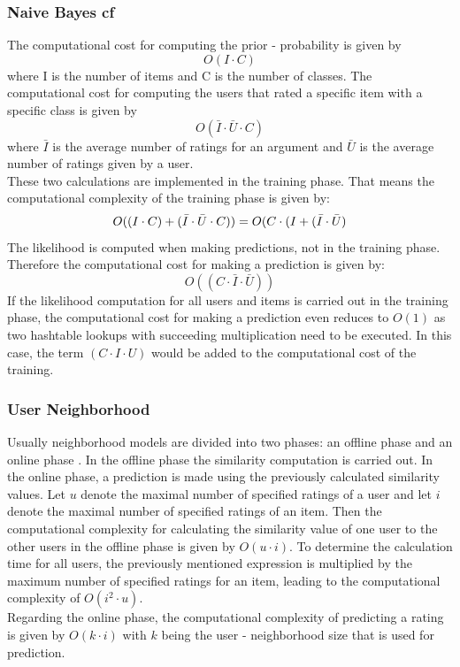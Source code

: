 \subsubsection{Naive Bayes \acrshort{cf}}
The computational cost for computing the prior - probability is given by\\
\begin{equation}
    O(I \cdot C)
\end{equation}
where I is the number of items and C is the number of classes.
The computational cost for computing the users that rated a specific item with a specific class is given by\\
\begin{equation}
    O(\bar{I} \cdot \bar{U} \cdot C)
\end{equation}
where $\bar{I}$ is the average number of ratings for an argument and $\bar{U}$ is the average number of ratings given by a user.\\
These two calculations are implemented in the training phase. That means the computational complexity of the training phase is given by:\\
\begin{equation}
    O((I \cdot C) + (\bar{I} \cdot \bar{U} \cdot C))\\ = O(C \cdot (I + (\bar{I} \cdot \bar{U})
\end{equation}
The likelihood is computed when making predictions, not in the training phase. Therefore the computational cost for making a prediction is given by:\\
\begin{equation}
    O((C \cdot \bar{I} \cdot \bar{U}))
\end{equation}
If the likelihood computation for all users and items is carried out in the training phase, the computational cost for making a prediction even reduces to $O(1)$ as two hashtable lookups with succeeding multiplication need to be executed. In this case, the term $(C \cdot I \cdot U)$ would be added to the computational cost of the training.

\subsubsection{User Neighborhood}
Usually neighborhood models are divided into two phases: an offline phase and an online phase \cite{aggarwal2016recommender}. In the offline phase the similarity computation is carried out. In the online phase, a prediction is made using the previously calculated similarity values.
Let $u$ denote the maximal number of specified ratings of a user and let $i$ denote the maximal number of specified ratings of an item. Then the computational complexity for calculating the similarity value of one user to the other users in the offline phase is given by $O(u \cdot i)$. 
To determine the calculation time for all users, the previously mentioned expression is multiplied by the maximum number of specified ratings for an item, leading to the computational complexity of $O(i^2 \cdot u)$.\\
Regarding the online phase, the computational complexity of predicting a rating is given by $O(k \cdot i)$ with $k$ being the user - neighborhood size that is used for prediction.
